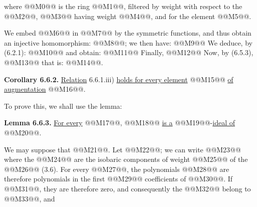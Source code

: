 where @@M0@@ is the ring @@M1@@, filtered by weight with respect to the @@M2@@, @@M3@@ having weight @@M4@@, and for the element @@M5@@.

We embed @@M6@@ in @@M7@@ by the symmetric functions, and thus obtain an injective homomorphism: @@M8@@; we then have:
@@M9@@
We deduce, by (6.2.1):
@@M10@@
and obtain:
@@M11@@
Finally,
@@M12@@
Now, by (6.5.3), @@M13@@
that is: @@M14@@.

\textbf{Corollary 6.6.2.} \uline{Relation} 6.6.1.iii) \uline{holds for every element} @@M15@@ \uline{of augmentation} @@M16@@.

To prove this, we shall use the lemma:

\textbf{Lemma 6.6.3.} \uline{For every} @@M17@@, @@M18@@ \uline{is a} @@M19@@-\uline{ideal of} @@M20@@.

We may suppose that @@M21@@. Let @@M22@@; we can write @@M23@@ where the @@M24@@ are the isobaric components of weight @@M25@@ of the @@M26@@ (3.6). For every @@M27@@, the polynomials @@M28@@ are therefore polynomials in the first @@M29@@ coefficients of @@M30@@. If @@M31@@, they are therefore zero, and consequently the @@M32@@ belong to @@M33@@, and
